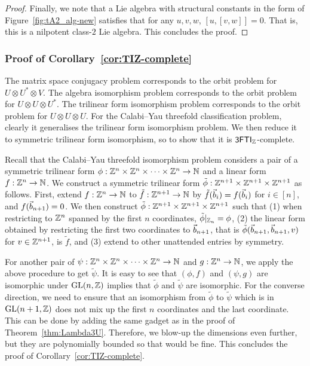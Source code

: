 \begin{proof}
Finally, we note that a Lie algebra with structural constants in the form of Figure~\ref{fig:tA2_alg-new} satisfies that for any $u, v, w$, $[u, [v, w]]=0$. That is, this is a nilpotent class-$2$ Lie algebra. This concludes the proof.
\end{proof}

\subsubsection{Proof of Corollary~\ref{cor:TIZ-complete}}

The matrix space conjugacy problem corresponds to the orbit problem for $U\otimes U^*\otimes V$. The algebra isomorphism problem corresponds to the orbit problem for $U\otimes U\otimes U^*$. The trilinear form isomorphism problem corresponds to the orbit problem for $U\otimes U\otimes U$. For the Calabi--Yau threefold classification problem, clearly it generalises the trilinear form isomorphism problem. We then reduce it to symmetric trilinear form isomorphism, so to show that it is ${\sf 3FTI}_{\mathbb{Z}}$-complete. 

Recall that the Calabi--Yau threefold isomorphism problem considers a pair of a symmetric trilinear form $\phi:\mathbb{Z}^n\times\mathbb{Z}^n\times\dots\times \mathbb{Z}^n\to \mathbb{N}$ and a linear form $f:\mathbb{Z}^n\to \mathbb{N}$. We construct a symmetric trilinear form $\tilde\phi:\mathbb{Z}^{n+1}\times\mathbb{Z}^{n+1}\times\mathbb{Z}^{n+1}$ as follows. First, extend $f:\mathbb{Z}^n\to \mathbb{N}$ to $\tilde f:\mathbb{Z}^{n+1}\to\mathbb{N}$ by $\tilde f(\vec{b}_i)=f(\vec{b}_i)$ for $i\in[n]$, and $f(\vec{b}_{n+1})=0$. We then construct $\tilde\phi:\mathbb{Z}^{n+1}\times\mathbb{Z}^{n+1}\times\mathbb{Z}^{n+1}$ such that (1) when restricting to $\mathbb{Z}^n$ spanned by the first $n$ coordinates, $\tilde\phi|_{\mathbb{Z}_n}=\phi$, (2) the linear form obtained by restricting the first two coordinates to $\vec{b}_{n+1}$, that is $\tilde\phi(\vec{b}_{n+1}, \vec{b}_{n+1}, v)$ for $v\in \mathbb{Z}^{n+1}$, is $\tilde f$, and (3) extend to other unattended entries by symmetry. 

For another pair of $\psi:\mathbb{Z}^n\times\mathbb{Z}^n\times\dots\times \mathbb{Z}^n\to \mathbb{N}$ and $g:\mathbb{Z}^n\to \mathbb{N}$, we apply the above procedure to get $\tilde\psi$. It is easy to see that $(\phi, f)$ and $(\psi, g)$ are isomorphic under $\mathrm{GL}(n, \mathbb{Z})$ implies that $\tilde\phi$ and $\tilde\psi$ are isomorphic. For the converse direction, we need to ensure that an isomorphism from $\tilde\phi$ to $\tilde\psi$ which is in $\mathrm{GL}(n+1, \mathbb{Z})$ does not mix up the first $n$ coordinates and the last coordinate. This can be done by adding the same gadget as in the proof of Theorem~\ref{thm:Lambda3U}. Therefore, we blow-up the dimensions even further, but they are polynomially bounded so that would be fine. This concludes the proof of Corollary~\ref{cor:TIZ-complete}.


